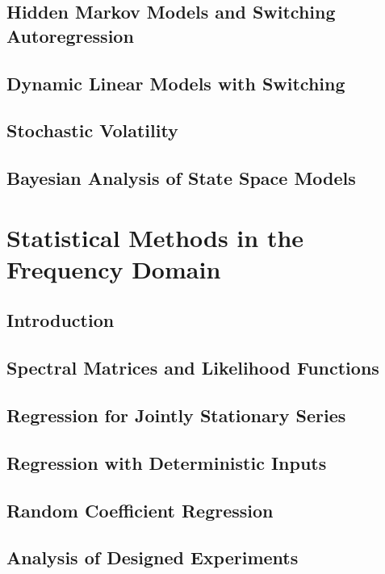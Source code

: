 \documentclass[12pt]{article}
\begin{document}
\subsection{Hidden Markov Models and Switching Autoregression}

\subsection{Dynamic Linear Models with Switching}

\subsection{Stochastic Volatility}

\subsection{Bayesian Analysis of State Space Models}


\section{Statistical Methods in the Frequency Domain}
\subsection{Introduction}

\subsection{Spectral Matrices and Likelihood Functions}

\subsection{Regression for Jointly Stationary Series}

\subsection{Regression with Deterministic Inputs}

\subsection{Random Coefficient Regression}

\subsection{Analysis of Designed Experiments}
\end{document}
